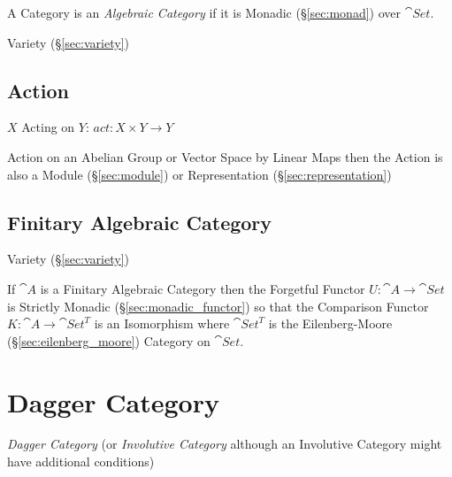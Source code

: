 A Category is an \emph{Algebraic Category} if it is Monadic (\S\ref{sec:monad})
over $\cat{Set}$.

Variety (\S\ref{sec:variety})



\subsection{Action}\label{sec:action}


$X$ Acting on $Y$: $act: X \times Y \rightarrow Y$

Action on an Abelian Group or Vector Space by Linear Maps then the
Action is also a Module (\S\ref{sec:module}) or Representation
(\S\ref{sec:representation})



\subsection{Finitary Algebraic Category}
\label{sec:finitary_algebraic_category}

Variety (\S\ref{sec:variety})

If $\cat{A}$ is a Finitary Algebraic Category then the Forgetful
Functor $U : \cat{A} \rightarrow \cat{Set}$ is Strictly Monadic
(\S\ref{sec:monadic_functor}) so that the Comparison Functor $K :
\cat{A} \rightarrow \cat{Set}^T$ is an Isomorphism where
$\cat{Set}^T$ is the Eilenberg-Moore (\S\ref{sec:eilenberg_moore})
Category on $\cat{Set}$.




\section{Dagger Category}\label{sec:dagger_category}

\emph{Dagger Category} (or \emph{Involutive Category} although an
Involutive Category might have additional conditions) %

